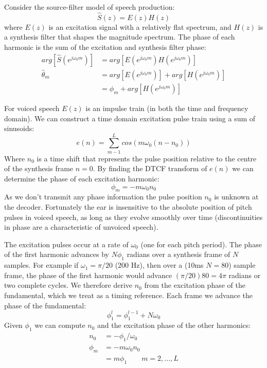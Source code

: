 \documentclass{article}
\begin{document}
{Consider the source-filter model of speech production:
\begin{equation}
\label{eq:source_filter}
\hat{S}(z)=E(z)H(z)
\end{equation}
where $E(z)$ is an excitation signal with a relatively flat spectrum, and $H(z)$ is a synthesis filter that shapes the magnitude spectrum.  The phase of each harmonic is the sum of the excitation and synthesis filter phase:
\begin{equation}
\begin{split}
arg \left[ \hat{S}(e^{j \omega_0 m}) \right] &= arg \left[ E(e^{j \omega_0 m}) H(e^{j \omega_0 m}) \right] \\
\hat{\theta}_m &= arg \left[ E(e^{j \omega_0 m}) \right] + arg \left[ H(e^{j \omega_0 m}) \right] \\
&= \phi_m +  arg \left[ H(e^{j \omega_0 m}) \right]
\end{split}
\end{equation}

For voiced speech $E(z)$ is an impulse train (in both the time and frequency domain). We can construct a time domain excitation pulse train using a sum of sinusoids:
\begin{equation}
e(n) = \sum_{m-1}^L cos( m \omega_0 (n - n_0))
\end{equation}
Where $n_0$ is a time shift that represents the pulse position relative to the centre of the synthesis frame $n=0$. By finding the DTCF transform of $e(n)$ we can determine the phase of each excitation harmonic:
\begin{equation}
\phi_m = - m \omega_0 n_0
\end{equation}
As we don't transmit any phase information the pulse position $n_0$ is unknown at the decoder.  Fortunately the ear is insensitive to the absolute position of pitch pulses in voiced speech, as long as they evolve smoothly over time (discontinuities in phase are a characteristic of unvoiced speech).

The excitation pulses occur at a rate of $\omega_0$ (one for each pitch period). The phase of the first harmonic advances by $N \phi_1$ radians over a synthesis frame of $N$ samples.  For example if $\omega_1 = \pi /20$ (200 Hz), then over a (10ms $N=80$) sample frame, the phase of the first harmonic would advance $(\pi/20)80 = 4 \pi$ radians or two complete cycles. We therefore derive $n_0$ from the excitation phase of the fundamental, which we treat as a timing reference.  Each frame we advance the phase of the fundamental:
\begin{equation}
\phi_1^l = \phi_1^{l-1} + N\omega_0
\end{equation}
Given $\phi_1$ we can compute $n_0$ and the excitation phase of the other harmonics:
\begin{equation}
\begin{split}
n_0    &= -\phi_1 / \omega_0 \\
\phi_m &= - m \omega_0 n_0 \\
       &= m \phi_1 \quad \quad m=2,...,L
\end{split}
\end{equation}

}
\end{document}
